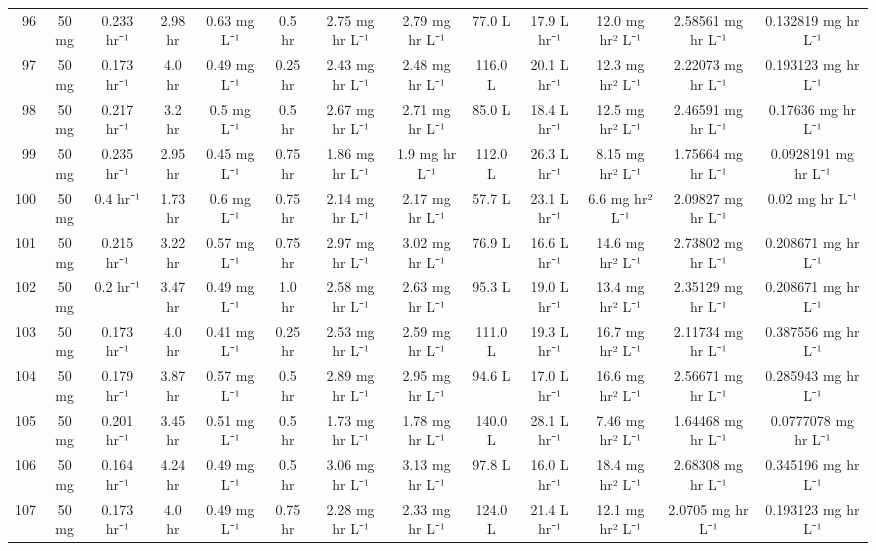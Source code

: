 \documentclass[12pt,a4paper]{article}
\begin{document}
\begin{tabular}{r|cccccccccccc}
	96 & 50 mg & 0.233 hr⁻¹ & 2.98 hr & 0.63 mg L⁻¹ & 0.5 hr & 2.75 mg hr L⁻¹ & 2.79 mg hr L⁻¹ & 77.0 L & 17.9 L hr⁻¹ & 12.0 mg hr² L⁻¹ & 2.58561 mg hr L⁻¹ & 0.132819 mg hr L⁻¹ \\
	97 & 50 mg & 0.173 hr⁻¹ & 4.0 hr & 0.49 mg L⁻¹ & 0.25 hr & 2.43 mg hr L⁻¹ & 2.48 mg hr L⁻¹ & 116.0 L & 20.1 L hr⁻¹ & 12.3 mg hr² L⁻¹ & 2.22073 mg hr L⁻¹ & 0.193123 mg hr L⁻¹ \\
	98 & 50 mg & 0.217 hr⁻¹ & 3.2 hr & 0.5 mg L⁻¹ & 0.5 hr & 2.67 mg hr L⁻¹ & 2.71 mg hr L⁻¹ & 85.0 L & 18.4 L hr⁻¹ & 12.5 mg hr² L⁻¹ & 2.46591 mg hr L⁻¹ & 0.17636 mg hr L⁻¹ \\
	99 & 50 mg & 0.235 hr⁻¹ & 2.95 hr & 0.45 mg L⁻¹ & 0.75 hr & 1.86 mg hr L⁻¹ & 1.9 mg hr L⁻¹ & 112.0 L & 26.3 L hr⁻¹ & 8.15 mg hr² L⁻¹ & 1.75664 mg hr L⁻¹ & 0.0928191 mg hr L⁻¹ \\
	100 & 50 mg & 0.4 hr⁻¹ & 1.73 hr & 0.6 mg L⁻¹ & 0.75 hr & 2.14 mg hr L⁻¹ & 2.17 mg hr L⁻¹ & 57.7 L & 23.1 L hr⁻¹ & 6.6 mg hr² L⁻¹ & 2.09827 mg hr L⁻¹ & 0.02 mg hr L⁻¹ \\
	101 & 50 mg & 0.215 hr⁻¹ & 3.22 hr & 0.57 mg L⁻¹ & 0.75 hr & 2.97 mg hr L⁻¹ & 3.02 mg hr L⁻¹ & 76.9 L & 16.6 L hr⁻¹ & 14.6 mg hr² L⁻¹ & 2.73802 mg hr L⁻¹ & 0.208671 mg hr L⁻¹ \\
	102 & 50 mg & 0.2 hr⁻¹ & 3.47 hr & 0.49 mg L⁻¹ & 1.0 hr & 2.58 mg hr L⁻¹ & 2.63 mg hr L⁻¹ & 95.3 L & 19.0 L hr⁻¹ & 13.4 mg hr² L⁻¹ & 2.35129 mg hr L⁻¹ & 0.208671 mg hr L⁻¹ \\
	103 & 50 mg & 0.173 hr⁻¹ & 4.0 hr & 0.41 mg L⁻¹ & 0.25 hr & 2.53 mg hr L⁻¹ & 2.59 mg hr L⁻¹ & 111.0 L & 19.3 L hr⁻¹ & 16.7 mg hr² L⁻¹ & 2.11734 mg hr L⁻¹ & 0.387556 mg hr L⁻¹ \\
	104 & 50 mg & 0.179 hr⁻¹ & 3.87 hr & 0.57 mg L⁻¹ & 0.5 hr & 2.89 mg hr L⁻¹ & 2.95 mg hr L⁻¹ & 94.6 L & 17.0 L hr⁻¹ & 16.6 mg hr² L⁻¹ & 2.56671 mg hr L⁻¹ & 0.285943 mg hr L⁻¹ \\
	105 & 50 mg & 0.201 hr⁻¹ & 3.45 hr & 0.51 mg L⁻¹ & 0.5 hr & 1.73 mg hr L⁻¹ & 1.78 mg hr L⁻¹ & 140.0 L & 28.1 L hr⁻¹ & 7.46 mg hr² L⁻¹ & 1.64468 mg hr L⁻¹ & 0.0777078 mg hr L⁻¹ \\
	106 & 50 mg & 0.164 hr⁻¹ & 4.24 hr & 0.49 mg L⁻¹ & 0.5 hr & 3.06 mg hr L⁻¹ & 3.13 mg hr L⁻¹ & 97.8 L & 16.0 L hr⁻¹ & 18.4 mg hr² L⁻¹ & 2.68308 mg hr L⁻¹ & 0.345196 mg hr L⁻¹ \\
	107 & 50 mg & 0.173 hr⁻¹ & 4.0 hr & 0.49 mg L⁻¹ & 0.75 hr & 2.28 mg hr L⁻¹ & 2.33 mg hr L⁻¹ & 124.0 L & 21.4 L hr⁻¹ & 12.1 mg hr² L⁻¹ & 2.0705 mg hr L⁻¹ & 0.193123 mg hr L⁻¹ \\
\end{tabular}
\end{document}
